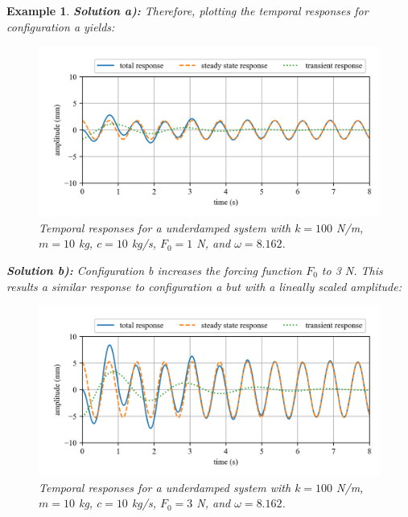 \documentclass[12pt,letter]{article}
\newtheorem{ex}{Example}
\numberwithin{ex}{section} %
\newenvironment{example}{\begin{mdframed}[middlelinewidth=0.5mm]\begin{ex}\normalfont}{\end{ex}\end{mdframed}}
\numberwithin{re}{section} %
\numberwithin{vcs}{section} %
\begin{document}
\begin{example}
				
				\noindent\textbf{Solution a):} Therefore, plotting the temporal responses for configuration a yields:
				\begin{figure}[H]
					\centering
					\includegraphics[]{../figures/homogeneous_and_particular_solutions_in_resonance_a.png}
					\caption{Temporal responses for a underdamped system with $k=100$ N/m, $m=10$ kg,  $c=10$ kg/s, $F_0=1$ N, and $\omega = 8.162$.}
				\end{figure}			
				 
				\noindent\textbf{Solution b):} Configuration b increases the forcing function $F_0$ to 3 N. This results a similar response to configuration a but with a lineally scaled amplitude:
				\begin{figure}[H]
					\centering
					\includegraphics[]{../figures/homogeneous_and_particular_solutions_in_resonance_b.png}
					\caption{Temporal responses for a underdamped system with $k=100$ N/m, $m=10$ kg,  $c=10$ kg/s, $F_0=3$ N, and $\omega = 8.162$.}
				\end{figure}			
				

\end{example}
\end{document}
